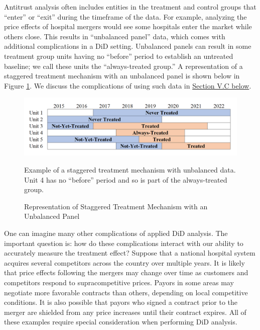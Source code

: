 \documentclass[12pt]{article}
\begin{document}
Antitrust analysis often includes entities in the treatment and control groups that “enter” or “exit” during the timeframe of the data. For example, analyzing the price effects of hospital mergers would see some hospitals enter the market while others close. This results in ``unbalanced panel'' data, which comes with additional complications in a DiD setting. Unbalanced panels can result in some treatment group units having no ``before'' period to establish an untreated baseline; we call these units the ``always-treated group.'' A representation of a staggered treatment mechanism with an unbalanced panel is shown below in Figure \ref{fig:visual-unbalanced}. We discuss the complications of using such data in \hyperref[sec:unbalanced]{Section V.C below}.
\begin{figure}[H]
    \centering
    \caption{Representation of Staggered Treatment Mechanism with an Unbalanced Panel}
    \includegraphics[width=5in]{Figures/Visual Staggered Unbalanced Treatment.PNG}
    \vspace{2mm}
    \footnotesize \begin{singlespace*}
        \parbox{5.5in}{Example of a staggered treatment mechanism with unbalanced data. Unit 4 has no “before” period and so is part of the always-treated group.}
    \end{singlespace*}
    \label{fig:visual-unbalanced}
\end{figure}
One can imagine many other complications of applied DiD analysis. The important question is: how do these complications interact with our ability to accurately measure the treatment effect? Suppose that a national hospital system acquires several competitors across the country over multiple years. It is likely that price effects following the mergers may change over time as customers and competitors respond to supracompetitive prices. Payors in some areas may negotiate more favorable contracts than others, depending on local competitive conditions. It is also possible that payors who signed a contract prior to the merger are shielded from any price increases until their contract expires. All of these examples require special consideration when performing DiD analysis.
\end{document}
